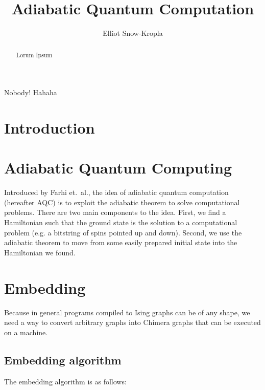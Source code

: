 \documentclass[12pt]{dalthesis}
\begin{document}
\title{Adiabatic Quantum Computation}
\author{Elliot Snow-Kropla}



\frontmatter

\begin{abstract}
	Lorum Ipsum
\end{abstract}

\begin{acknowledgements}
	Nobody! Hahaha
\end{acknowledgements}

\mainmatter

\chapter{Introduction}

\chapter{Adiabatic Quantum Computing}
Introduced by Farhi et.\ al.\cite{farhi}, the idea of adiabatic quantum computation (hereafter AQC) is to exploit the adiabatic theorem to solve computational problems.  There are two main components to the idea.  First, we find a Hamiltonian such that the ground state is the solution to a computational problem (e.g. a bitstring of spins pointed up and down).  Second, we use the adiabatic theorem to move from some easily prepared initial state into the Hamiltonian we found.

\chapter{Embedding}
Because in general programs compiled to Ising graphs can be of any shape, we need a way to convert arbitrary graphs into Chimera graphs that can be executed on a machine.

\section{ Embedding algorithm}

The embedding algorithm is as follows:
\end{document}
